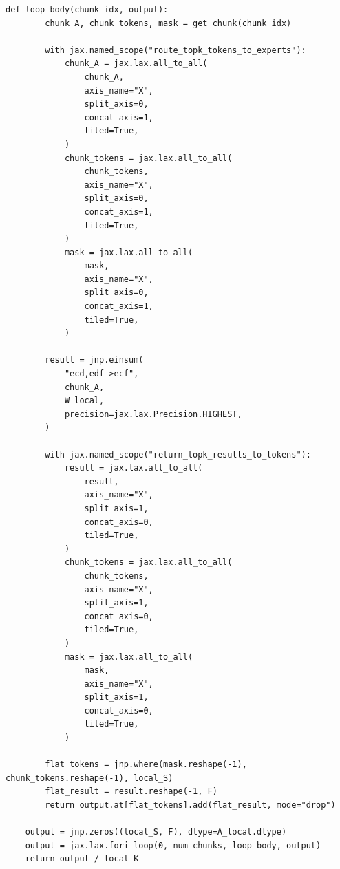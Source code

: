 \documentclass[11pt]{article}
\begin{document}
\begin{enumerate}
\begin{lstlisting}[style=pythoncode]
    def loop_body(chunk_idx, output):
        chunk_A, chunk_tokens, mask = get_chunk(chunk_idx)

        with jax.named_scope("route_topk_tokens_to_experts"):
            chunk_A = jax.lax.all_to_all(
                chunk_A,
                axis_name="X",
                split_axis=0,
                concat_axis=1,
                tiled=True,
            )
            chunk_tokens = jax.lax.all_to_all(
                chunk_tokens,
                axis_name="X",
                split_axis=0,
                concat_axis=1,
                tiled=True,
            )
            mask = jax.lax.all_to_all(
                mask,
                axis_name="X",
                split_axis=0,
                concat_axis=1,
                tiled=True,
            )

        result = jnp.einsum(
            "ecd,edf->ecf",
            chunk_A,
            W_local,
            precision=jax.lax.Precision.HIGHEST,
        )

        with jax.named_scope("return_topk_results_to_tokens"):
            result = jax.lax.all_to_all(
                result,
                axis_name="X",
                split_axis=1,
                concat_axis=0,
                tiled=True,
            )
            chunk_tokens = jax.lax.all_to_all(
                chunk_tokens,
                axis_name="X",
                split_axis=1,
                concat_axis=0,
                tiled=True,
            )
            mask = jax.lax.all_to_all(
                mask,
                axis_name="X",
                split_axis=1,
                concat_axis=0,
                tiled=True,
            )

        flat_tokens = jnp.where(mask.reshape(-1), chunk_tokens.reshape(-1), local_S)
        flat_result = result.reshape(-1, F)
        return output.at[flat_tokens].add(flat_result, mode="drop")

    output = jnp.zeros((local_S, F), dtype=A_local.dtype)
    output = jax.lax.fori_loop(0, num_chunks, loop_body, output)
    return output / local_K
\end{lstlisting}
\end{enumerate}

\clearpage
\end{document}
